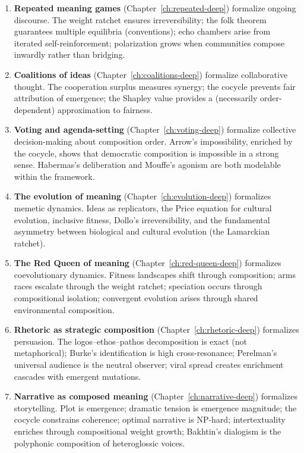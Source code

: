 \begin{enumerate}
  \item \textbf{Repeated meaning games} (Chapter~\ref{ch:repeated-deep})
        formalize ongoing discourse.  The weight ratchet ensures irreversibility;
        the folk theorem guarantees multiple equilibria (conventions); echo
        chambers arise from iterated self-reinforcement; polarization grows
        when communities compose inwardly rather than bridging.

  \item \textbf{Coalitions of ideas} (Chapter~\ref{ch:coalitions-deep})
        formalize collaborative thought.  The cooperation surplus measures
        synergy; the cocycle prevents fair attribution of emergence; the
        Shapley value provides a (necessarily order-dependent) approximation
        to fairness.

  \item \textbf{Voting and agenda-setting} (Chapter~\ref{ch:voting-deep})
        formalize collective decision-making about composition order.
        Arrow's impossibility, enriched by the cocycle, shows that democratic
        composition is impossible in a strong sense.  Habermas's deliberation
        and Mouffe's agonism are both modelable within the framework.

  \item \textbf{The evolution of meaning} (Chapter~\ref{ch:evolution-deep})
        formalizes memetic dynamics.  Ideas as replicators, the Price equation
        for cultural evolution, inclusive fitness, Dollo's irreversibility,
        and the fundamental asymmetry between biological and cultural
        evolution (the Lamarckian ratchet).

  \item \textbf{The Red Queen of meaning} (Chapter~\ref{ch:red-queen-deep})
        formalizes coevolutionary dynamics.  Fitness landscapes shift through
        composition; arms races escalate through the weight ratchet;
        speciation occurs through compositional isolation; convergent
        evolution arises through shared environmental composition.

  \item \textbf{Rhetoric as strategic composition}
        (Chapter~\ref{ch:rhetoric-deep}) formalizes persuasion.  The
        logos--ethos--pathos decomposition is exact (not metaphorical);
        Burke's identification is high cross-resonance; Perelman's universal
        audience is the neutral observer; viral spread creates enrichment
        cascades with emergent mutations.

  \item \textbf{Narrative as composed meaning}
        (Chapter~\ref{ch:narrative-deep}) formalizes storytelling.  Plot is
        emergence; dramatic tension is emergence magnitude; the cocycle
        constrains coherence; optimal narrative is NP-hard; intertextuality
        enriches through compositional weight growth; Bakhtin's dialogism
        is the polyphonic composition of heteroglossic voices.
\end{enumerate}

